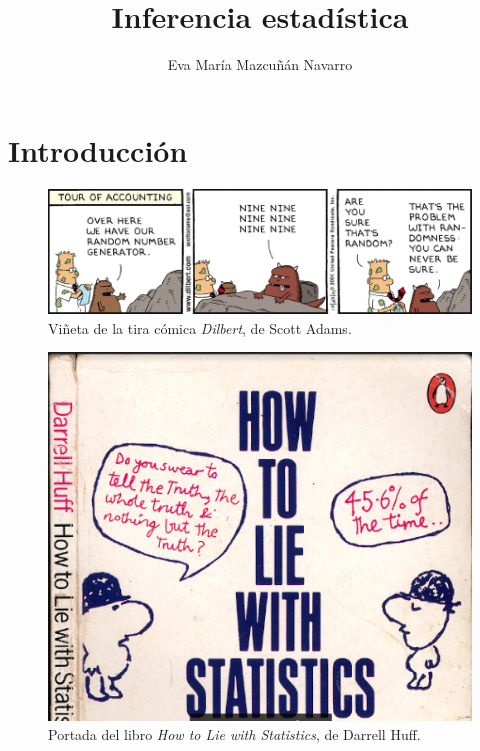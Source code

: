 \documentclass[
  notoc,
  nobib,
  degree=mec]{mnye}
\title{Inferencia estadística}
\author{Eva María Mazcuñán Navarro}
\date{}
\begin{document}
\maketitle

%

{
\hypersetup{linkcolor=etoccolor}
\setcounter{tocdepth}{2}
\tableofcontents
}
\hypertarget{section}{%
\section*{}\label{section}}

\hypertarget{intro}{%
\section*{Introducción}\label{intro}}



\begin{figure}

{\centering \includegraphics[width=1\linewidth]{graficos/dilbertc} 

}

\caption{Viñeta de la tira cómica \emph{Dilbert}, de Scott Adams.}\label{fig:dilbert}
\end{figure}



\begin{figure}

{\centering \includegraphics[width=0.7\linewidth]{graficos/HowToLieWithStatistics4} 

}

\caption{Portada del libro \emph{How to Lie with Statistics}, de Darrell Huff.}\label{fig:lie}
\end{figure}
\end{document}
